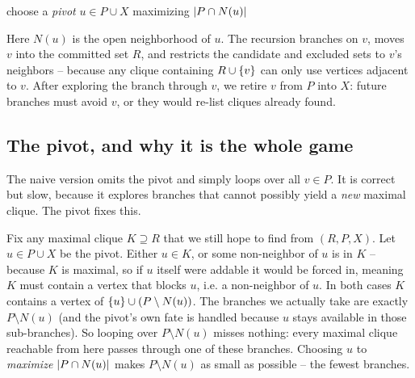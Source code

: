 \begin{algorithm}[H]
\caption{\textsc{BronKerbosch}$(R,P,X)$ -- enumerate maximal cliques}
\label{ch29:alg-bk}
\DontPrintSemicolon
{}
choose a \emph{pivot} $u\in P\cup X$ maximizing $\lvert P\cap N(u)\rvert$\;
\end{algorithm}

Here $N(u)$ is the open neighborhood of $u$. The recursion branches on $v$, moves
$v$ into the committed set $R$, and restricts the candidate and excluded sets to
$v$'s neighbors -- because any clique containing $R\cup\{v\}$ can only use
vertices adjacent to $v$. After exploring the branch through $v$, we retire $v$
from $P$ into $X$: future branches must avoid $v$, or they would re-list cliques
already found.

\subsection{The pivot, and why it is the whole game}
\label{ch29:bk-pivot}

The naive version omits the pivot and simply loops over all $v\in P$. It is
correct but slow, because it explores branches that cannot possibly yield a
\emph{new} maximal clique. The pivot fixes this.

\begin{whybox}
Fix any maximal clique $K\supseteq R$ that we still hope to find from $(R,P,X)$.
Let $u\in P\cup X$ be the pivot. Either $u\in K$, or some non-neighbor of $u$ is
in $K$ -- because $K$ is maximal, so if $u$ itself were addable it would be
forced in, meaning $K$ must contain a vertex that blocks $u$, i.e. a non-neighbor
of $u$. In both cases $K$ contains a vertex of $\{u\}\cup(P\setminus N(u))$.
The branches we actually take are exactly $P\setminus N(u)$ (and the pivot's own
fate is handled because $u$ stays available in those sub-branches). So looping
over $P\setminus N(u)$ misses nothing: every maximal clique reachable from here
passes through one of these branches. Choosing $u$ to \emph{maximize}
$\lvert P\cap N(u)\rvert$ makes $P\setminus N(u)$ as small as possible -- the fewest
branches.
\end{whybox}

